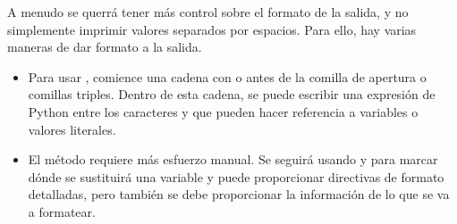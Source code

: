 \documentclass[a5paper,10pt,spanish]{sphinxmanual}
\begin{document}
\sphinxAtStartPar
A menudo se querrá tener más control sobre el formato de la salida, y no  simplemente imprimir valores separados por espacios. Para ello, hay varias maneras de dar formato a la salida.
\begin{itemize}
\item {} 
\sphinxAtStartPar
Para usar {\hyperref[\detokenize{tutorial/inputoutput:tut-f-strings}]{}}, comience una cadena con  o  antes de la comilla de apertura o comillas triples. Dentro de esta cadena,  se puede escribir una expresión de Python entre los caracteres \sphinxcode{\sphinxupquote{\{}} y \sphinxcode{\sphinxupquote{\}}} que pueden hacer referencia a variables o valores literales.

\begin{sphinxVerbatim}[commandchars=\\\{\}]
  
  
\end{sphinxVerbatim}

\item {} 
\sphinxAtStartPar
El método   requiere más esfuerzo manual.  Se seguirá usando \sphinxcode{\sphinxupquote{\{}} y \sphinxcode{\sphinxupquote{\}}} para marcar dónde se sustituirá una variable y puede proporcionar directivas de formato detalladas, pero también se debe proporcionar la información de lo que se va a formatear.

\begin{sphinxVerbatim}[commandchars=\\\{\}]
  
  
      
 
\end{sphinxVerbatim}


\end{itemize}
\end{document}
